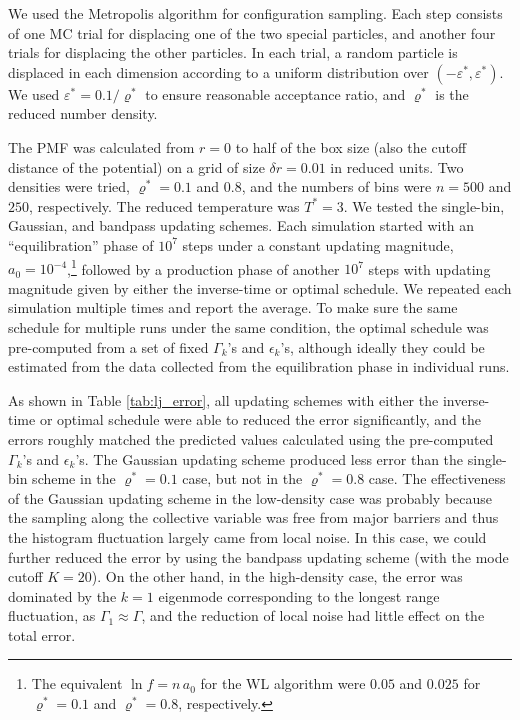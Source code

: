 \documentclass[preprint, superscriptaddress, floatfix]{revtex4-1}
\begin{document}
We used the Metropolis algorithm\cite{frenkel, metropolis1953}
for configuration sampling.
%
Each step consists of
one MC trial for displacing one of the two special particles,
and another four trials for displacing the other particles.
%
In each trial,
a random particle is displaced in each dimension
according to a uniform distribution over $(-\varepsilon^*, \varepsilon^*)$.
We used $\varepsilon^* = 0.1/\varrho^*$
to ensure reasonable acceptance ratio,
and $\varrho^*$ is the reduced number density.


The PMF was calculated from $r = 0$ to half of the box size
(also the cutoff distance of the potential)
on a grid of size $\delta r = 0.01$ in reduced units.
%
Two densities were tried, $\varrho^* = 0.1$ and $0.8$,
and the numbers of bins were $n = 500$ and $250$, respectively.
%
The reduced temperature was $T^* = 3$.
%
We tested the single-bin, Gaussian, and bandpass updating schemes.
%
Each simulation started with an ``equilibration'' phase
of $10^7$ steps under a constant updating magnitude,
$a_0 = 10^{-4}$,\footnote{The equivalent $\ln f = n \, a_0$ for the WL algorithm
were $0.05$ and $0.025$ for $\varrho^* = 0.1$ and $\varrho^* = 0.8$, respectively.}
followed by a production phase of another $10^7$ steps
with updating magnitude given by
either the inverse-time or optimal schedule.
%
We repeated each simulation multiple times
and report the average.
%
To make sure the same schedule for multiple runs under the same condition,
the optimal schedule was pre-computed from a set of fixed
$\Gamma_k$'s and $\epsilon_k$'s,
although ideally they could be estimated from the data
collected from the equilibration phase in individual runs.



As shown in Table \ref{tab:lj_error},
all updating schemes
with either the inverse-time or optimal schedule
were able to reduced
the error significantly,
and the errors roughly matched the predicted values
calculated using the pre-computed
$\Gamma_k$'s and $\epsilon_k$'s.
%
The Gaussian updating scheme produced less error than
the single-bin scheme in the $\varrho^* = 0.1$ case,
but not in the $\varrho^* = 0.8$ case.
%
The effectiveness of the Gaussian updating scheme
in the low-density case
was probably because the sampling along
the collective variable was free from major barriers
and thus the histogram fluctuation largely
came from local noise.
%
In this case, we could further reduced the error
by using the bandpass updating scheme
(with the mode cutoff $K = 20$).
%
On the other hand, in the high-density case,
the error was dominated by the $k=1$ eigenmode
corresponding to the longest range fluctuation,
as $\Gamma_1 \approx \Gamma$,
and the reduction of local noise
had little effect on the total error.
\end{document}

